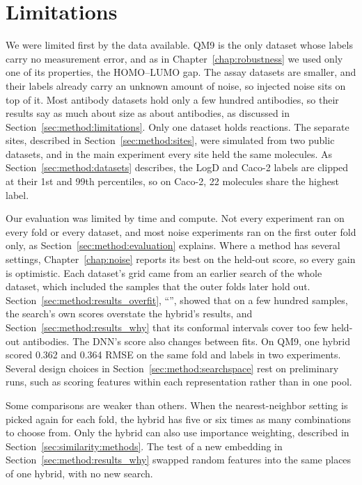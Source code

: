 \section{Limitations}\label{sec:discussion:limitations}

We were limited first by the data available. QM9 is the only dataset whose labels carry no measurement error, and as in Chapter~\ref{chap:robustness} we used only one of its properties, the HOMO--LUMO gap. The assay datasets are smaller, and their labels already carry an unknown amount of noise, so injected noise sits on top of it. Most antibody datasets hold only a few hundred antibodies, so their results say as much about size as about antibodies, as discussed in Section~\ref{sec:method:limitations}. Only one dataset holds reactions. The separate sites, described in Section~\ref{sec:method:sites}, were simulated from two public datasets, and in the main experiment every site held the same molecules. As Section~\ref{sec:method:datasets} describes, the LogD and Caco-2 labels are clipped at their 1st and 99th percentiles, so on Caco-2, 22 molecules share the highest label.

Our evaluation was limited by time and compute. Not every experiment ran on every fold or every dataset, and most noise experiments ran on the first outer fold only, as Section~\ref{sec:method:evaluation} explains. Where a method has several settings, Chapter~\ref{chap:noise} reports its best on the held-out score, so every gain is optimistic. Each dataset's grid came from an earlier search of the whole dataset, which included the samples that the outer folds later hold out. Section~\ref{sec:method:results_overfit}, ``'', showed that on a few hundred samples, the search's own scores overstate the hybrid's results, and Section~\ref{sec:method:results_why} that its conformal intervals cover too few held-out antibodies. The DNN's score also changes between fits. On QM9, one hybrid scored 0.362 and 0.364 RMSE on the same fold and labels in two experiments. Several design choices in Section~\ref{sec:method:searchspace} rest on preliminary runs, such as scoring features within each representation rather than in one pool.

Some comparisons are weaker than others. When the nearest-neighbor setting is picked again for each fold, the hybrid has five or six times as many combinations to choose from. Only the hybrid can also use importance weighting, described in Section~\ref{sec:similarity:methods}. The test of a new embedding in Section~\ref{sec:method:results_why} swapped random features into the same places of one hybrid, with no new search.

